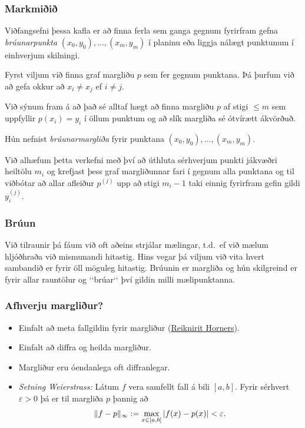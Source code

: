 \documentclass[a4paper,10pt,icelandic]{sphinxmanual}
\begin{document}
\subsubsection{Markmiðið}
\label{kafli03:index-0}\label{kafli03:markmii}
Viðfangsefni þessa kafla er að finna ferla sem ganga gegnum fyrirfram
gefna \emph{brúunarpunkta} \((x_0,y_0),\dots,(x_m,y_m)\) í planinu eða liggja nálægt
punktunum í einhverjum skilningi.

Fyrst viljum við finna graf margliðu \(p\) sem fer gegnum punktana.
Þá þurfum við að gefa okkur að \(x_i\neq x_j\) ef \(i\neq j\).

Við sýnum fram á að það sé alltaf hægt að finna margliðu \(p\) af
stigi \(\leq m\) sem uppfyllir \(p(x_i)=y_i\) í öllum punktum og
að slík margliða sé ótvírætt ákvörðuð.

Hún nefnist \emph{brúunarmargliða} fyrir punktana
\((x_0,y_0),\dots,(x_m,y_m)\).

Við alhæfum þetta verkefni með því að úthluta sérhverjum punkti jákvæðri
heiltölu \(m_i\) og krefjast þess graf margliðunnar fari í gegnum
alla punktana og til viðbótar að allar afleiður \(p^{(j)}\) upp að
stigi \(m_i-1\) taki einnig fyrirfram gefin gildi \(y^{(j)}_i\).


\subsubsection{Brúun}
\label{kafli03:id1}
Við tilraunir þá fáum við oft aðeins strjálar mælingar, t.d. ef við
mælum hljóðhraða við mismunandi hitastig. Hins vegar þá viljum við vita
hvert sambandið er fyrir öll möguleg hitastig. Brúunin er margliða og
hún skilgreind er fyrir allar rauntölur og {}`{}`brúar{}`{}` því gildin
milli mælipunktanna.


\subsubsection{Afhverju margliður?}
\label{kafli03:index-1}\label{kafli03:afhverju-margliur}\begin{itemize}
\item {} 
Einfalt að meta fallgildin fyrir margliður ({\hyperref[kafli03:reiknirit-horners]{Reiknirit Horners}}).

\item {} 
Einfalt að diffra og heilda margliður.

\item {} 
Margliður eru óendanlega oft diffranlegar.

\item {} 
\emph{Setning Weierstrass:} Látum \(f\) vera samfellt fall á bili
\([a,b]\). Fyrir sérhvert \({\varepsilon}> 0\) þá er til
margliða \(p\) þannig að
\begin{gather}
\begin{split}\|f-p\|_\infty := \max_{x\in [a,b]} |f(x)-p(x)| < {\varepsilon}.\end{split}\notag
\end{gather}
\end{itemize}
\end{document}
